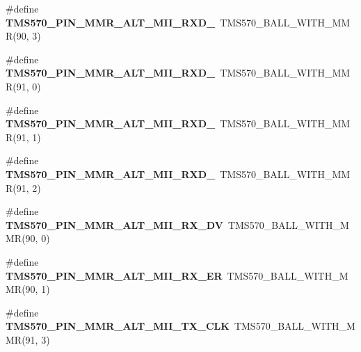 \begin{DoxyCompactItemize}
\item 
\mbox{\label{tms570lc4357-pins_8h_a83a43c5b8e0cb96b327e661b4782b704}} 
\#define {\bfseries T\+M\+S570\+\_\+\+P\+I\+N\+\_\+\+M\+M\+R\+\_\+\+A\+L\+T\+\_\+\+M\+I\+I\+\_\+\+R\+X\+D\+\_}~T\+M\+S570\+\_\+\+B\+A\+L\+L\+\_\+\+W\+I\+T\+H\+\_\+\+M\+MR(90, 3)
\item 
\mbox{\label{tms570lc4357-pins_8h_a1dfc1f30753b2f70898758d9a9bcacdf}} 
\#define {\bfseries T\+M\+S570\+\_\+\+P\+I\+N\+\_\+\+M\+M\+R\+\_\+\+A\+L\+T\+\_\+\+M\+I\+I\+\_\+\+R\+X\+D\+\_}~T\+M\+S570\+\_\+\+B\+A\+L\+L\+\_\+\+W\+I\+T\+H\+\_\+\+M\+MR(91, 0)
\item 
\mbox{\label{tms570lc4357-pins_8h_a311c079bf80f3d0b8508c7f737fe0b1e}} 
\#define {\bfseries T\+M\+S570\+\_\+\+P\+I\+N\+\_\+\+M\+M\+R\+\_\+\+A\+L\+T\+\_\+\+M\+I\+I\+\_\+\+R\+X\+D\+\_}~T\+M\+S570\+\_\+\+B\+A\+L\+L\+\_\+\+W\+I\+T\+H\+\_\+\+M\+MR(91, 1)
\item 
\mbox{\label{tms570lc4357-pins_8h_a0316e95e9db0dba85125ea3df5b715ce}} 
\#define {\bfseries T\+M\+S570\+\_\+\+P\+I\+N\+\_\+\+M\+M\+R\+\_\+\+A\+L\+T\+\_\+\+M\+I\+I\+\_\+\+R\+X\+D\+\_}~T\+M\+S570\+\_\+\+B\+A\+L\+L\+\_\+\+W\+I\+T\+H\+\_\+\+M\+MR(91, 2)
\item 
\mbox{\label{tms570lc4357-pins_8h_aea895738f429342cae946e5990d4f4f2}} 
\#define {\bfseries T\+M\+S570\+\_\+\+P\+I\+N\+\_\+\+M\+M\+R\+\_\+\+A\+L\+T\+\_\+\+M\+I\+I\+\_\+\+R\+X\+\_\+\+DV}~T\+M\+S570\+\_\+\+B\+A\+L\+L\+\_\+\+W\+I\+T\+H\+\_\+\+M\+MR(90, 0)
\item 
\mbox{\label{tms570lc4357-pins_8h_a2e8dd023a93f25ac9011ffec6de85d4e}} 
\#define {\bfseries T\+M\+S570\+\_\+\+P\+I\+N\+\_\+\+M\+M\+R\+\_\+\+A\+L\+T\+\_\+\+M\+I\+I\+\_\+\+R\+X\+\_\+\+ER}~T\+M\+S570\+\_\+\+B\+A\+L\+L\+\_\+\+W\+I\+T\+H\+\_\+\+M\+MR(90, 1)
\item 
\mbox{\label{tms570lc4357-pins_8h_aa5901ff80be7cebc11524c5c0a367093}} 
\#define {\bfseries T\+M\+S570\+\_\+\+P\+I\+N\+\_\+\+M\+M\+R\+\_\+\+A\+L\+T\+\_\+\+M\+I\+I\+\_\+\+T\+X\+\_\+\+C\+LK}~T\+M\+S570\+\_\+\+B\+A\+L\+L\+\_\+\+W\+I\+T\+H\+\_\+\+M\+MR(91, 3)
\item 

\end{DoxyCompactItemize}
